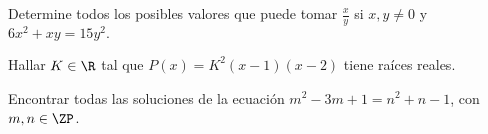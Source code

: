 {    \begin{exercise}
        Determine todos los posibles valores que puede tomar $\frac{x}{y}$ si $x, y \neq 0$ y $6x^2 + xy = 15y^2.$
    \end{exercise}

    \begin{exercise}
        Hallar $K \in \R$ tal que $P(x) = K^2(x - 1)(x - 2)$ tiene raíces reales.
    \end{exercise}

    \begin{exercise}
        Encontrar todas las soluciones de la ecuación $m^2 - 3m + 1 = n^2 + n - 1$, con $m, n \in \ZP$.
    \end{exercise}
}
\label{sec:desarrollo}


